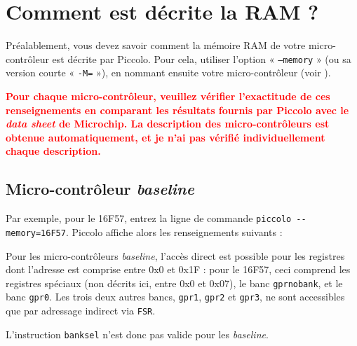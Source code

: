 
\cleardoublepage


\thispagestyle{empty}








\section{Comment est décrite la RAM ?}

Préalablement, vous devez savoir comment la mémoire RAM de votre micro-contrôleur est décrite par Piccolo. Pour cela, utiliser l’option « \texttt{--memory} » (ou sa version courte « \texttt{-M=} »), en nommant ensuite votre micro-contrôleur (voir ).

\textcolor{red}{\bf Pour chaque micro-contrôleur, veuillez vérifier l’exactitude de ces renseignements en comparant les résultats fournis par Piccolo avec le \emph{data sheet} de Microchip. La description des micro-contrôleurs est obtenue automatiquement, et je n’ai pas vérifié individuellement chaque description.}



\subsection{Micro-contrôleur \emph{baseline}}

Par exemple, pour le 16F57, entrez la ligne de commande \texttt{piccolo -{}-memory=16F57}. Piccolo affiche alors les renseignements suivants :

{\footnotesize }

Pour les micro-contrôleurs \emph{baseline}, l'accès direct est possible pour les registres dont l'adresse est comprise entre 0x0 et 0x1F : pour le 16F57, ceci comprend les registres spéciaux (non décrits ici, entre 0x0 et 0x07), le banc \texttt{gprnobank}, et le banc \texttt{gpr0}. Les trois deux autres bancs, \texttt{gpr1}, \texttt{gpr2} et \texttt{gpr3}, ne sont accessibles que par adressage indirect via \texttt{FSR}.

L'instruction \texttt{banksel} n'est donc pas valide pour les \emph{baseline}.


